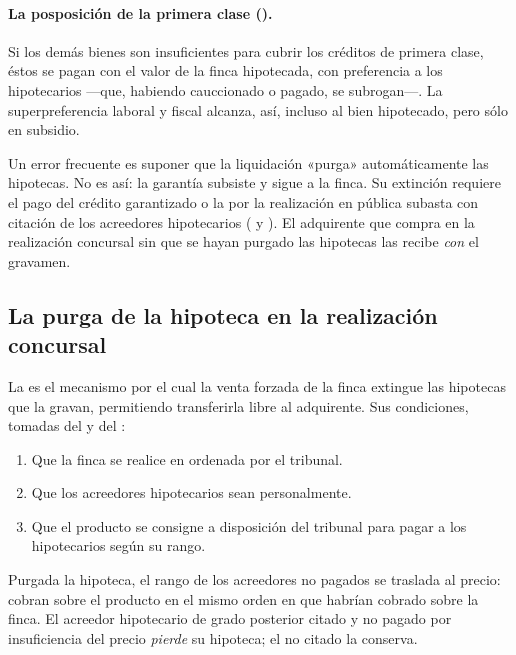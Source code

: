 \paragraph{La posposición de la primera clase ().} Si los demás bienes son insuficientes
para cubrir los créditos de primera clase, éstos se pagan con el valor de la finca hipotecada, con
preferencia a los hipotecarios ---que, habiendo cauccionado o pagado, se subrogan---. La superpreferencia
laboral y fiscal alcanza, así, incluso al bien hipotecado, pero sólo en subsidio.

\begin{alerta}
Un error frecuente es suponer que la liquidación «purga» automáticamente las hipotecas. No es así:
la garantía subsiste y sigue a la finca. Su extinción requiere el pago del crédito garantizado o la
 por la realización en pública subasta con citación de los acreedores
hipotecarios ( y ). El adquirente que compra en la realización concursal sin
que se hayan purgado las hipotecas las recibe \emph{con} el gravamen.
\end{alerta}

\subsection{La purga de la hipoteca en la realización concursal}

La  es el mecanismo por el cual la venta forzada de la finca extingue las hipotecas
que la gravan, permitiendo transferirla libre al adquirente. Sus condiciones, tomadas del 
y del :

\begin{enumerate}
  \item Que la finca se realice en  ordenada por el tribunal.
  \item Que los acreedores hipotecarios sean  personalmente.
  \item Que el producto se consigne a disposición del tribunal para pagar a los hipotecarios según
  su rango.
\end{enumerate}

Purgada la hipoteca, el rango de los acreedores no pagados se traslada al precio: cobran sobre el
producto en el mismo orden en que habrían cobrado sobre la finca. El acreedor hipotecario de grado
posterior citado y no pagado por insuficiencia del precio \emph{pierde} su hipoteca; el no citado la
conserva.

